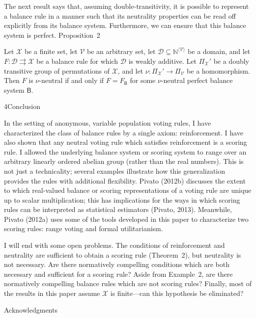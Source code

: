 \documentclass[
]{article}
\begin{document}
The next result says that, assuming double-transitivity, it is possible
to represent a balance rule in a manner such that its neutrality
properties can be read off explicitly from its balance system.
Furthermore, we can ensure that this balance system is perfect.
Proposition~2

Let \(\mathcal{X}\) be a finite set, let \(\mathcal{V}\) be an arbitrary
set, let
\(\mathcal{D} \subseteq \mathbb{N}^{\langle\mathcal{V}\rangle}\) be a
domain, and let
\(\left. F:\mathcal{D}\rightrightarrows\mathcal{X} \right.\) be a
balance rule for which \(\mathcal{D}\) is weakly additive. Let
\(\Pi_{\mathcal{X}}'\) be a doubly transitive group of permutations of
\(\mathcal{X}\), and let
\(\left. \nu:\Pi_{\mathcal{X}}'\longrightarrow\Pi_{\mathcal{V}} \right.\)
be a homomorphism. Then \(F\) is \(\nu\)-neutral if and only if
\(F = F_{\mathsf{B}}\) for some \(\nu\)-neutral perfect balance system
\(\mathsf{B}\).

\protect{}\label{s000020}
4Conclusion

In the setting of anonymous, variable population voting rules, I have
characterized the class of balance rules by a single axiom:
reinforcement. I have also shown that any neutral voting rule which
satisfies reinforcement is a scoring rule. I allowed the underlying
balance system or scoring system to range over an arbitrary linearly
ordered abelian group (rather than the real numbers). This is not just a
technicality; several examples illustrate how this generalization
provides the rules with additional flexibility. Pivato (2012b) discusses
the extent to which real-valued balance or scoring representations of a
voting rule are unique up to scalar multiplication; this has
implications for the ways in which scoring rules can be interpreted as
statistical estimators (Pivato, 2013). Meanwhile, Pivato (2012a) uses
some of the tools developed in this paper to characterize two scoring
rules: range voting and formal utilitarianism.

I will end with some open problems. The conditions of reinforcement and
neutrality are sufficient to obtain a scoring rule (Theorem~2), but
neutrality is not necessary. Are there normatively compelling conditions
which are both necessary and sufficient for a scoring rule? Aside from
Example~2, are there normatively compelling balance rules which are not
scoring rules? Finally, most of the results in this paper assume
\(\mathcal{X}\) is finite---can this hypothesis be eliminated?

Acknowledgments
\end{document}
